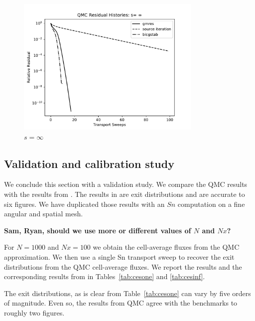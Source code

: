 \begin{figure}[h]
\centerline{
\includegraphics[width=3.5in]{FIGURES/seqinf.pdf}
}
\caption{\label{fig:hard} $s=\infty$}
\end{figure}

\clearpage

\subsection{Validation and calibration study}
\label{validation-and-calibration-study}

We conclude this section with a validation study. We compare the
QMC results with the results from \cite{cesinh}. The results
in \cite{cesinh} are exit distributions and are accurate to 
six figures. We have duplicated those results with an $Sn$ computation
on a fine angular and spatial mesh.

{\bf Sam, Ryan, should we use more or different values of $N$ and $Nx$?}

For $N = 1000$ and $Nx=100$ we obtain the cell-average fluxes from
the QMC approximation. We then use a single Sn transport sweep to recover
the exit distributions from the QMC cell-average fluxes. We report
the results and the corresponding results from \cite{cesinh} in 
Tables~\ref{tab:cesone} and \ref{tab:cesinf}.

The exit distributions, as is clear from Table~\ref{tab:cesone}
can vary by five orders of magnitude. Even so, the results from QMC
agree with the benchmarks to roughly two figures.


